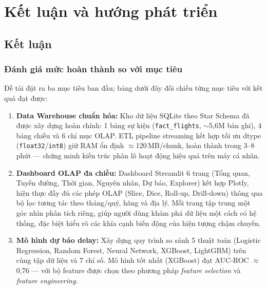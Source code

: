 \clearpage
\section{Kết luận và hướng phát triển}

\subsection{Kết luận}

\subsubsection{Đánh giá mức hoàn thành so với mục tiêu}

Đề tài đặt ra ba mục tiêu ban đầu; bảng dưới đây đối chiếu
từng mục tiêu với kết quả đạt được:

\begin{enumerate}
    \item \textbf{Data Warehouse chuẩn hóa:}
    Kho dữ liệu SQLite theo Star Schema đã được xây dựng hoàn chỉnh:
    1 bảng sự kiện (\texttt{fact\_flights}, $\sim$5{,}6M bản ghi),
    4 bảng chiều và 6 chỉ mục OLAP.
    ETL pipeline streaming kết hợp tối ưu dtype (\texttt{float32}/\texttt{int8})
    giữ RAM ổn định $\approx$120\,MB/chunk, hoàn thành trong 3--8 phút ---
    chứng minh kiến trúc phân lô hoạt động hiệu quả trên máy cá nhân.

    \item \textbf{Dashboard OLAP đa chiều:}
    Dashboard Streamlit 6 trang (Tổng quan, Tuyến đường, Thời gian,
    Nguyên nhân, Dự báo, Explorer) kết hợp Plotly,
    hiện thực đầy đủ các phép OLAP (Slice, Dice, Roll-up, Drill-down)
    thông qua bộ lọc tương tác theo tháng/quý, hãng và địa lý.
    Mỗi trang tập trung một góc nhìn phân tích riêng,
    giúp người dùng khám phá dữ liệu một cách có hệ thống, đặc biệt hiểu rõ các khía cạnh biến động của hiện tượng chậm chuyến.

    \item \textbf{Mô hình dự báo delay:}
    Xây dựng quy trình so sánh 5 thuật toán (Logistic Regression, Random Forest,
    Neural Network, XGBoost, LightGBM) trên cùng tập dữ liệu và 7 chỉ số.
    Mô hình tốt nhất (XGBoost) đạt AUC-ROC $\approx$ 0{,}76 --- với bộ feature
    được chọn theo phương pháp \textit{feature selection} và \textit{feature engineering}.
\end{enumerate}

